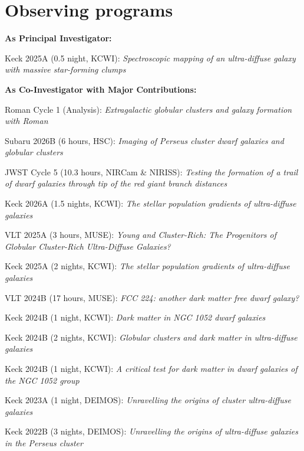 \documentclass[letterpaper,11pt]{article}
\begin{document}
\section{Observing programs}
{\bf As Principal Investigator:}
\vspace{-0.2cm}
\begin{etaremune}[itemsep=0pt]
\item Keck 2025A (0.5 night, KCWI): {\em Spectroscopic mapping of an ultra-diffuse galaxy with massive star-forming clumps}
\end{etaremune}
\vspace{-0.2cm}
{\bf As Co-Investigator with Major Contributions:}
\vspace{-0.2cm}
\begin{etaremune}[itemsep=0pt]
\item Roman Cycle 1 (Analysis): {\em Extragalactic globular clusters and galaxy formation with Roman}
\item Subaru 2026B (6 hours, HSC): {\em Imaging of Perseus cluster dwarf galaxies and globular clusters}
\item JWST Cycle 5 (10.3 hours, NIRCam \& NIRISS): {\em Testing the formation of a trail of dwarf galaxies through tip of the red giant branch distances}
\item Keck 2026A (1.5 nights, KCWI): {\em The stellar population gradients of ultra-diffuse galaxies}
\item VLT 2025A (3 hours, MUSE): {\em Young and Cluster-Rich: The Progenitors of Globular Cluster-Rich Ultra-Diffuse Galaxies?}
\item Keck 2025A (2 nights, KCWI): {\em The stellar population gradients of ultra-diffuse galaxies}
\item VLT 2024B (17 hours, MUSE): {\em FCC 224: another dark matter free dwarf galaxy?} 
\item Keck 2024B (1 night, KCWI): {\em Dark matter in NGC 1052 dwarf galaxies}
\item Keck 2024B (2 nights, KCWI): {\em Globular clusters and dark matter in ultra-diffuse galaxies}
\item Keck 2024B (1 night, KCWI): {\em A critical test for dark matter in dwarf galaxies of the NGC 1052 group}
\item Keck 2023A (1 night, DEIMOS): {\em Unravelling the origins of cluster ultra-diffuse galaxies}
\item Keck 2022B (3 nights, DEIMOS): {\em Unravelling the origins of ultra-diffuse galaxies in the Perseus cluster}
\end{etaremune}
\end{document}
